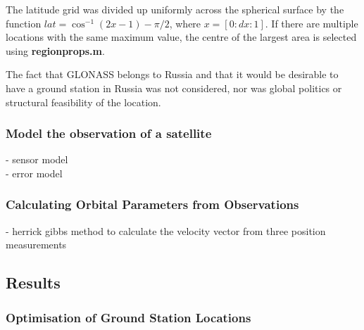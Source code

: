 \documentclass[Space3_Assign2]{subfile}
\begin{document}
The latitude grid was divided up uniformly across the spherical surface by the function $lat = \cos^{-1}(2x-1)-\pi/2$, where $x = [0:dx:1]$. If there are multiple locations with the same maximum value, the centre of the largest area is selected using \textbf{regionprops.m}.

The fact that GLONASS belongs to Russia and that it would be desirable to have a ground station in Russia was not considered, nor was global politics or structural feasibility of the location. 

\subsubsection{Model the observation of a satellite}
- sensor model\\
- error model \\

\subsubsection{Calculating Orbital Parameters from Observations}
- herrick gibbs method to calculate the velocity vector from three position measurements



\subsection{Results}
\subsubsection{Optimisation of Ground Station Locations}
\end{document}
